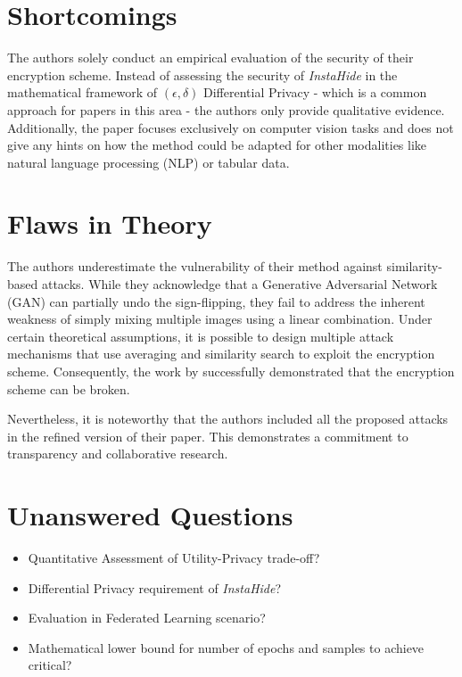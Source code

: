 \documentclass[12pt,a4paper]{article}
\begin{document}
\section{Shortcomings}

The authors solely conduct an empirical evaluation of the security of their encryption scheme. Instead of assessing the security of \textit{InstaHide} in the mathematical framework of $(\epsilon, \delta)$ Differential Privacy - which is a common approach for papers in this area - the authors only provide qualitative evidence. \\

Additionally, the paper focuses exclusively on computer vision tasks and does not give any hints on how the method could be adapted for other modalities like natural language processing (NLP) or tabular data.

\section{Flaws in Theory}

The authors underestimate the vulnerability of their method against similarity-based attacks. While they acknowledge that a Generative Adversarial Network (GAN) can partially undo the sign-flipping, they fail to address the inherent weakness of simply mixing multiple images using a linear combination. Under certain theoretical assumptions, it is possible to design multiple attack mechanisms that use averaging and similarity search to exploit the encryption scheme. Consequently, the work by \citeauthor{carlini2021privatelearningpossibleinstance} successfully demonstrated that the encryption scheme can be broken.

Nevertheless, it is noteworthy that the authors included all the proposed attacks in the refined version of their paper. This demonstrates a commitment to transparency and collaborative research.

\section{Unanswered Questions}

\begin{itemize}
    \item Quantitative Assessment of Utility-Privacy trade-off?
    \item Differential Privacy requirement of \textit{InstaHide}?
    \item Evaluation in Federated Learning scenario?
    \item Mathematical lower bound for number of epochs and samples to achieve critical?
\end{itemize}
\end{document}
